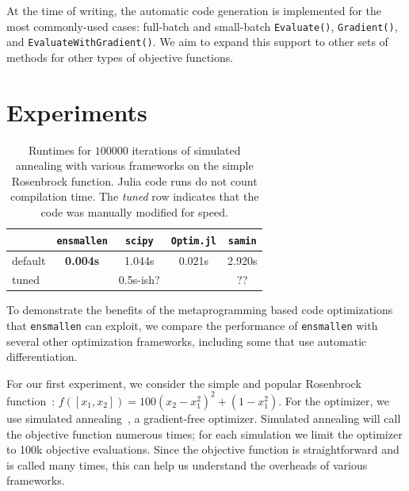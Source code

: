 \documentclass{article}
\begin{document}
At the time of writing, the automatic code generation
is implemented for the most commonly-used cases:
full-batch and small-batch \texttt{\small Evaluate()}, \texttt{\small Gradient()},
and \texttt{\small EvaluateWithGradient()}.  We aim to expand this support to other
sets of methods for other types of objective functions.


\vspace*{-0.3em}
\section{Experiments}
\vspace*{-0.5em}

\begin{table}[t]
\begin{center}
\begin{tabular}{lcccc}
\toprule
 & {\tt ensmallen} & {\tt scipy} & {\tt Optim.jl} & {\tt samin} \\
\midrule
default & {\bf 0.004s} & 1.044s & 0.021s & 2.920s \\
tuned & & 0.5s-ish? & & ?? \\ %
\bottomrule
\end{tabular}
\end{center}
\caption{Runtimes for $100000$ iterations of simulated annealing with various
frameworks on the simple Rosenbrock function.  Julia code runs do not count
compilation time.  The {\it tuned} row indicates that the code was manually
modified for speed.}
\label{tab:rosenbrock_results}
\end{table}

To demonstrate the benefits of the metaprogramming based code optimizations
that {\tt ensmallen} can exploit,
we compare the performance of {\tt ensmallen} with several other
optimization frameworks, including some that use automatic differentiation.

For our first experiment, we consider the simple and popular Rosenbrock
function~\cite{Rosenbrock1960}: $f([x_1, x_2]) = 100 (x_2 - x_1^2)^2 + (1 -
x_1^2)$.  For the optimizer, we use simulated
annealing~\cite{kirkpatrick1983optimization}, a gradient-free optimizer.
Simulated annealing will call the objective function numerous times; for each
simulation we limit the optimizer to 100k objective evaluations.  Since the
objective function is straightforward and is called many times, this can help us
understand the overheads of various frameworks.
\end{document}
